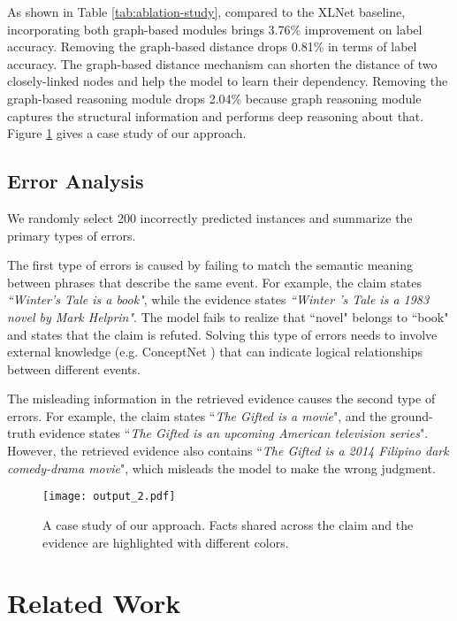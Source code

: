 \documentclass[11pt,a4paper]{article}
\begin{document}
As shown in Table \ref{tab:ablation-study}, compared to the XLNet baseline, incorporating both graph-based modules brings 3.76\% improvement on label accuracy.
Removing the graph-based distance drops 0.81\% in terms of label accuracy.
The graph-based distance mechanism can shorten the distance of two closely-linked nodes and help the model to learn their dependency.
Removing the graph-based reasoning module drops 2.04\% because graph reasoning module captures the structural information and \mbox{performs} deep reasoning about that.
Figure \ref{fig:model-output} gives a case study of our approach.





\subsection{Error Analysis}
We randomly select 200 incorrectly predicted instances and summarize the primary types of errors.
\par
The first type of errors is caused by failing to match the semantic meaning between phrases that describe the same event. For example, the claim states \textit{``Winter's Tale is a book"}, while the evidence states \textit{``Winter 's Tale is a 1983 novel by Mark Helprin"}. The model fails to realize that ``novel" belongs to ``book" and states that the claim is refuted. Solving this type of errors needs to involve external knowledge (e.g. ConceptNet \cite{speer2017conceptnet}) that can indicate logical relationships between different events.
\par
The misleading information in the retrieved evidence causes the second type of errors. 
For example, the claim states ``\textit{The Gifted is a movie}", and the ground-truth evidence states ``\textit{The Gifted is an upcoming American television series}". However, the retrieved evidence also contains ``\textit{The Gifted is a 2014 Filipino dark comedy-drama movie}", which misleads the model to make the wrong judgment.


\begin{figure}[t]
	\texttt{[image: output\_2.pdf]}
	\caption{A case study of our approach. Facts shared across the claim and the evidence are highlighted with different colors.}
	\label{fig:model-output}
\end{figure}
\section{Related Work}
\end{document}
